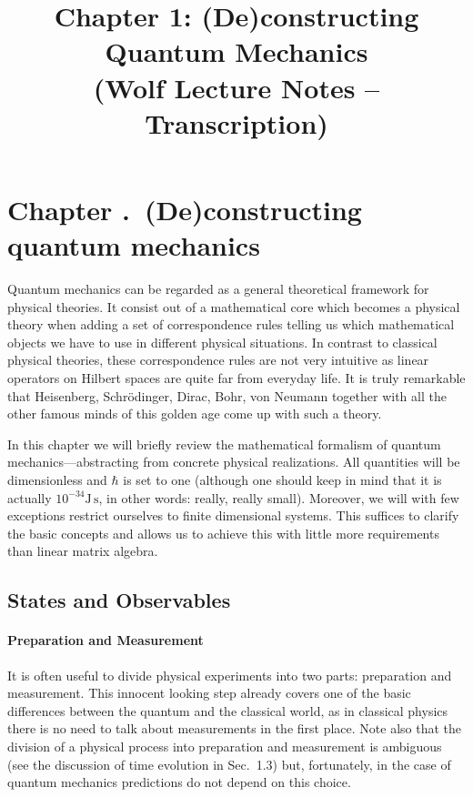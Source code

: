 \documentclass[11pt,a4paper]{article}
\title{Chapter 1: (De)constructing Quantum Mechanics\\ {\small (Wolf Lecture Notes -- Transcription)}}
\date{}
\theoremstyle{plain}
\theoremstyle{definition}
\theoremstyle{remark}
\numberwithin{equation}{section}
\begin{document}
\maketitle
\tableofcontents

\setcounter{section}{1}
\section*{Chapter \thesection.\ (De)constructing quantum mechanics}

Quantum mechanics can be regarded as a general theoretical framework for
physical theories. It consist out of a mathematical core which becomes a phys\-ical theory when adding a set of correspondence rules telling us which mathe\-matical objects we have to use in different physical situations. In contrast to
classical physical theories, these correspondence rules are not very intuitive as
linear operators on Hilbert spaces are quite far from everyday life. It is truly
remarkable that Heisenberg, Schr\"odinger, Dirac, Bohr, von Neumann together
with all the other famous minds of this golden age come up with such a theory.

In this chapter we will briefly review the mathematical formalism of quan\-tum
mechanics---abstracting from concrete physical realizations. All quantities
will be dimensionless and $\hbar$ is set to one (although one should keep in mind
that it is actually $10^{-34} \mathrm{J\,s}$, in other words: really, really small).
Moreover, we will with few exceptions restrict ourselves to finite dimensional systems. This
suffices to clarify the basic concepts and allows us to achieve this with little
more requirements than linear matrix algebra.

\subsection{States and Observables}

\paragraph{Preparation and Measurement}
It is often useful to divide physical experi\-ments into two parts: preparation
and measurement. This innocent looking step already covers one of the basic
differences between the quantum and the classi\-cal world, as in classical physics
there is no need to talk about measurements in the first place. Note also that the division of a physical process into preparation and measurement is ambiguous (see the discussion of time evolution in Sec.~1.3) but, fortunately, in the case of quantum mechanics predictions do not depend on this choice.
\end{document}
